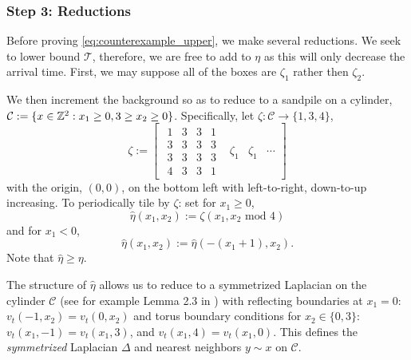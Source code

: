 \documentclass[12pt]{amsart}
\begin{document}
\subsubsection*{Step 3: Reductions}
Before proving \eqref{eq:counterexample_upper}, we make several reductions.
We seek to lower bound $\mathcal{T}$, therefore, we are free to add
to $\eta$ as this will only decrease the arrival time. First, we may suppose all of the boxes are $\zeta_1$ rather then $\zeta_2$. 

We then increment the background so as to reduce to a sandpile on a cylinder,  $\mathcal{C} := \{ x \in \mathbb{Z}^2 : x_1 \geq 0,  3 \geq x_2 \geq 0\}$. 
Specifically, let $\zeta: \mathcal{C} \to \{1, 3, 4\}$, 
\[
\zeta := 
\begin{bmatrix}
\begin{matrix}
1 & 3 & 3 & 1 \\
3 & 3 & 3 & 3 \\
3 & 3 & 3 & 3 \\
4 & 3 & 3 & 1 
\end{matrix}
& \zeta_1 & \zeta_1 & \cdots
\end{bmatrix}
\]
with the origin, $(0,0)$, on the bottom left with left-to-right, down-to-up 
increasing.  To 
periodically tile by $\zeta$: set for $x_1 \geq 0$, 
\[
\hat{\eta}(x_1, x_2) :=
\zeta(x_1, x_2 \mbox{ mod } 4)
\]
and for $x_1 < 0$, 
\[
\hat{\eta}(x_1, x_2) := \hat{\eta}(-(x_1+1), x_2).
\]
Note that $\hat{\eta} \geq \eta$. 

The structure of $\hat{\eta}$ allows us to reduce
to a symmetrized Laplacian on the cylinder $\mathcal{C}$ (see for example Lemma 2.3 in \cite{bou2020dynamic}) with reflecting boundaries at $x_1 = 0$: $v_t(-1, x_2) = v_t(0,x_2)$
and torus boundary conditions for $x_2 \in \{0,3\}$: $v_t(x_1, -1) = v_t(x_1,3)$, and $v_t(x_1, 4) = v_t(x_1,0)$.  This defines the {\it symmetrized} Laplacian $\Delta$ and nearest neighbors $y \sim x$ on $\mathcal{C}$. 
\end{document}
